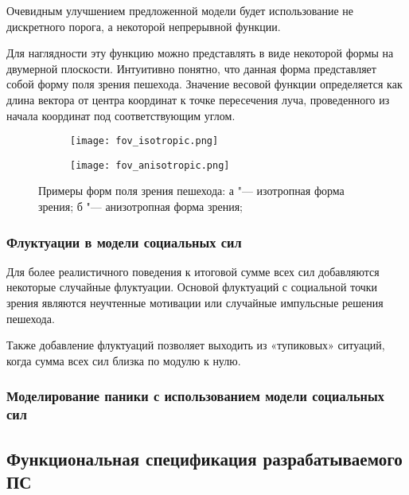 Очевидным улучшением предложенной модели будет использование не дискретного порога, а некоторой непрерывной функции.

Для наглядности эту функцию можно представлять в виде некоторой формы на двумерной плоскости.
Интуитивно понятно, что данная форма представляет собой форму поля зрения пешехода.
Значение весовой функции определяется как длина вектора от центра координат к точке пересечения луча, проведенного из начала координат под соответствующим углом.

\begin{figure}[ht]
\centering
  \begin{subfigure}[b]{0.45\textwidth}
    \centering
    \texttt{[image: fov\_isotropic.png]}
    \caption{}
  \end{subfigure}
  \begin{subfigure}[b]{0.45\textwidth}
    \centering
    \texttt{[image: fov\_anisotropic.png]}
    \caption{}
  \end{subfigure}
  \caption{ Примеры форм поля зрения пешехода: а "--- изотропная форма зрения;
            б "--- анизотропная форма зрения;}
  \label{sec:model:sf:fov:example_figure}
\end{figure}

\subsubsection{Флуктуации в модели социальных сил}
\label{sec:model:sf:fluctuation}

Для более реалистичного поведения к итоговой сумме всех сил добавляются некоторые случайные флуктуации.
Основой флуктуаций с социальной точки зрения являются неучтенные мотивации или случайные импульсные решения пешехода.

Также добавление флуктуаций позволяет выходить из «тупиковых» ситуаций, когда сумма всех сил близка по модулю к нулю.

\subsubsection{Моделирование паники с использованием модели социальных сил}
\label{sec:model:sf:panic}

\subsection{Функциональная спецификация разрабатываемого ПС}
\label{sec:model:func_spec}
